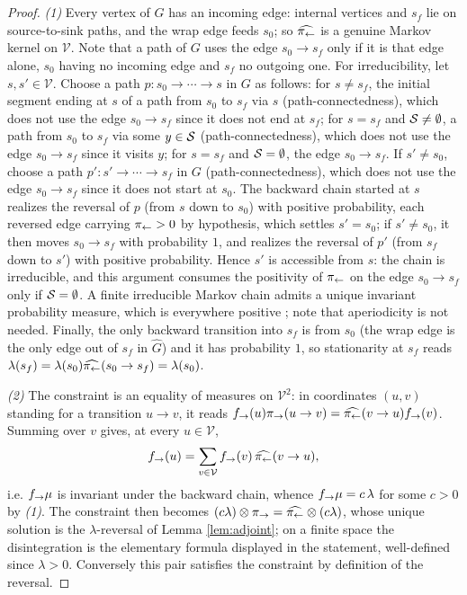\begin{proof}
\emph{(1)} Every vertex of $\widehat G$ has an incoming edge: internal vertices and $s_f$ lie on source-to-sink paths, and the wrap edge feeds $s_0$; so $\widehat{\pi_{\leftarrow}}$ is a genuine Markov kernel on $\mathcal V$. Note that a path of $G$ uses the edge $s_0\rightarrow s_f$ only if it is that edge alone, $s_0$ having no incoming edge and $s_f$ no outgoing one. For irreducibility, let $s,s'\in\mathcal V$. Choose a path $p: s_0\rightarrow\cdots\rightarrow s$ in $G$ as follows: for $s\neq s_f$, the initial segment ending at $s$ of a path from $s_0$ to $s_f$ via $s$ (path-connectedness), which does not use the edge $s_0\rightarrow s_f$ since it does not end at $s_f$; for $s=s_f$ and $\mathcal S\neq\emptyset$, a path from $s_0$ to $s_f$ via some $y\in\mathcal S$ (path-connectedness), which does not use the edge $s_0\rightarrow s_f$ since it visits $y$; for $s=s_f$ and $\mathcal S=\emptyset$, the edge $s_0\rightarrow s_f$. If $s'\neq s_0$, choose a path $p': s'\rightarrow\cdots\rightarrow s_f$ in $G$ (path-connectedness), which does not use the edge $s_0\rightarrow s_f$ since it does not start at $s_0$. The backward chain started at $s$ realizes the reversal of $p$ (from $s$ down to $s_0$) with positive probability, each reversed edge carrying $\pi_{\leftarrow}>0$ by hypothesis, which settles $s'=s_0$; if $s'\neq s_0$, it then moves $s_0\rightarrow s_f$ with probability $1$, and realizes the reversal of $p'$ (from $s_f$ down to $s'$) with positive probability. Hence $s'$ is accessible from $s$: the chain is irreducible, and this argument consumes the positivity of $\pi_{\leftarrow}$ on the edge $s_0\rightarrow s_f$ only if $\mathcal S=\emptyset$. A finite irreducible Markov chain admits a unique invariant probability measure, which is everywhere positive \cite{levin2017markov}; note that aperiodicity is not needed. Finally, the only backward transition into $s_f$ is from $s_0$ (the wrap edge is the only edge out of $s_f$ in $\widehat G$) and it has probability $1$, so stationarity at $s_f$ reads $\lambda(s_f)=\lambda(s_0)\widehat{\pi_{\leftarrow}}(s_0\rightarrow s_f)=\lambda(s_0)$.

\emph{(2)} The constraint is an equality of measures on $\mathcal V^2$: in coordinates $(u,v)$ standing for a transition $u\rightarrow v$, it reads $f_{\rightarrow}(u)\pi_{\rightarrow}(u\rightarrow v) = \widehat{\pi_{\leftarrow}}(v\rightarrow u)f_{\rightarrow}(v)$. Summing over $v$ gives, at every $u\in \mathcal V$,
\begin{equation*}
f_{\rightarrow}(u) = \sum_{v\in\mathcal V}f_{\rightarrow}(v)\,\widehat{\pi_{\leftarrow}}(v\rightarrow u),
\end{equation*}
i.e. $f_{\rightarrow}\mu$ is invariant under the backward chain, whence $f_{\rightarrow}\mu = c\,\lambda$ for some $c>0$ by \emph{(1)}. The constraint then becomes $(c\lambda)\otimes\pi_{\rightarrow} = \widehat{\pi_{\leftarrow}}\otimes(c\lambda)$, whose unique solution is the $\lambda$-reversal of Lemma \ref{lem:adjoint}; on a finite space the disintegration is the elementary formula displayed in the statement, well-defined since $\lambda>0$. Conversely this pair satisfies the constraint by definition of the reversal.


\end{proof}
